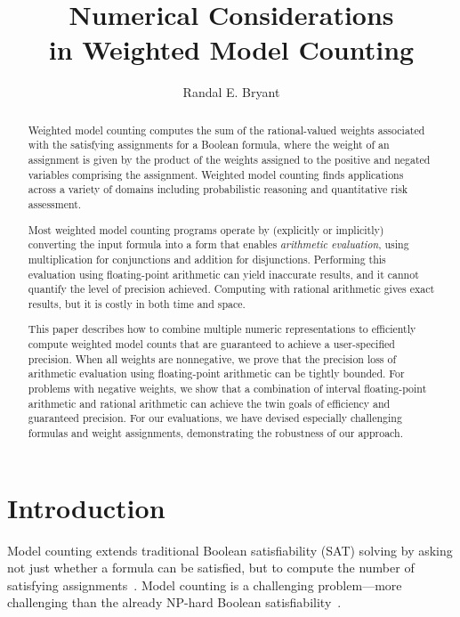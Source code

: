 \documentclass[
hf
]{ceurart}
\title{Numerical Considerations \\in Weighted Model Counting}
\author[1]{Randal E. Bryant}[%
orcid=0000-0001-5024-6613,
email=rebryant@cmu.edu,
url=https://www.cs.cmu.edu/~bryant,
]
\begin{document}
\maketitle

\begin{abstract}
 Weighted model counting computes the sum of the rational-valued weights
  associated with the satisfying assignments for a Boolean formula,
  where the weight of an assignment is given by the product of the
  weights assigned to the positive and negated variables
  comprising the assignment.  Weighted model counting finds
  applications across a variety of domains including probabilistic reasoning
  and quantitative risk assessment.

  Most weighted model counting programs operate by (explicitly or
  implicitly) converting the input formula into a form that enables
  \emph{arithmetic evaluation}, using multiplication for conjunctions
  and addition for disjunctions.  Performing this evaluation using
  floating-point arithmetic can yield inaccurate results, and it
  cannot quantify the level of precision achieved.  Computing with
  rational arithmetic gives exact results, but it is costly in both
  time and space.

  This paper describes how to combine multiple numeric representations
  to efficiently compute weighted model counts that are guaranteed to
  achieve a user-specified precision.  When all weights are
  nonnegative, we prove that the precision loss of arithmetic
  evaluation using floating-point arithmetic can be tightly bounded.
  For problems with negative weights, we show that a combination of
  interval floating-point arithmetic and rational arithmetic can
  achieve the twin goals of efficiency and guaranteed precision.  
  For our evaluations,
  we have devised especially challenging
  formulas and weight assignments, demonstrating the robustness of our approach.


\end{abstract}

\section{Introduction}

Model counting extends traditional Boolean satisfiability (SAT) solving by
asking not just whether a formula can be satisfied, but to compute the
number of satisfying assignments~\cite{gomes:hs:2009}.  Model counting is a challenging
problem---more challenging than the already NP-hard Boolean
satisfiability~\cite{valiant:siam:1979}.
\end{document}
